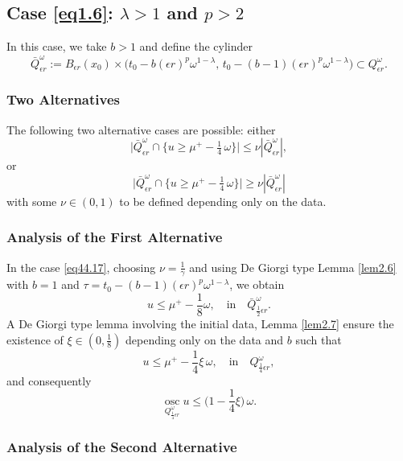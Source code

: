 \documentclass[a4paper,11pt,fullpage]{article}
\DeclareMathOperator*{\osc}{osc}
\numberwithin{equation}{section}
\begin{document}
\subsection{Case \eqref{eq1.6}: $\lambda>1$ and $p>2$}\label{sec-case3}
In this case, we take \(b>1\) and define the cylinder
\[
\bar{Q}^{\omega}_{\epsilon r} := B_{\epsilon r}(x_0) \times \big(t_0 - b(\epsilon r)^p \omega^{1-\lambda}, \, t_0 - (b-1)(\epsilon r)^p \omega^{1-\lambda} \big) \subset Q^{\omega}_{\epsilon r}.
\]

\subsubsection{Two Alternatives}

The following two alternative cases are possible: either 
\begin{equation}\label{eq44.17}
\big| \bar{Q}^{\omega}_{\epsilon r}\cap\{u\geqslant \mu^+-\tfrac{1}{4}\,\omega\}\big|\leqslant \nu |\bar{Q}^{\omega}_{\epsilon r}|,
\end{equation}
 or
\begin{equation}\label{eq44.18}
\big|\bar{Q}^{\omega}_{ \epsilon r}\cap\{u\geqslant \mu^+-\tfrac{1}{4}\,\omega\}\big|\geqslant \nu |\bar{Q}^{\omega}_{ \epsilon r}|
\end{equation}
with some $\nu \in (0, 1)$ to be defined depending only on the data.

\subsubsection{Analysis of the First Alternative}
In the  case \eqref{eq44.17}, choosing $\nu=\frac{1}{\gamma}$ and using De Giorgi type Lemma \ref{lem2.6} with $b=1$ and $\tau=t_0-(b-1)(\epsilon r)^p \omega^{1-\lambda}$, we obtain 
$$u\leqslant \mu^+-\frac{1}{8}\omega,\quad \text{in}\quad  \bar{Q}^{\omega}_{\frac{1}{2}\epsilon r}.$$
A De Giorgi type lemma involving the initial data, Lemma  \ref{lem2.7} ensure the existence of $\xi\in (0, \frac{1}{8})$ depending only on the data and  $b$  such that
$$u\leqslant \mu^+-\frac{1}{4}\xi\,\omega,\quad \text{in}\quad  Q^{\omega}_{\frac{1}{4}\epsilon r},$$
and consequently
\begin{equation}\label{eq44.19}
\osc\limits_{Q^{\omega}_{\frac{1}{4}\epsilon r}} u\leqslant \Big(1-\frac{1}{4}\xi\Big)\,\omega.
\end{equation}

\subsubsection{Analysis of the Second Alternative} 
\end{document}
